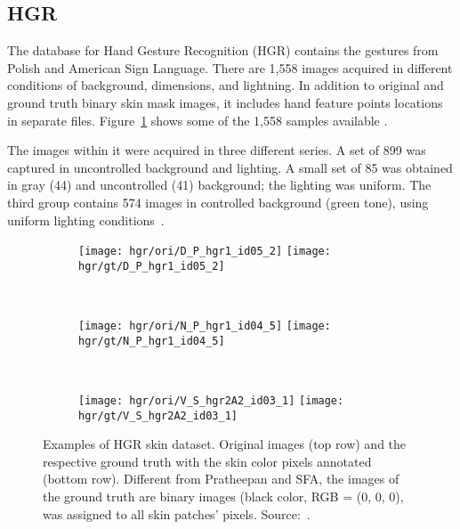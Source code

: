 \subsection{HGR}
\label{sec:datasets_hgr}
The database for Hand Gesture Recognition (HGR) contains the gestures from Polish and American Sign Language. There are 1,558 images acquired in different conditions of background, dimensions, and lightning. In addition to original and ground truth binary skin mask images, it includes hand feature points locations in separate files. Figure~\ref{fig:hgr_dataset_exemplo} shows some of the 1,558 samples available \citep{kawulok:14, nalepa:14, grzejszczak:16}.

The images within it were acquired in three different series. A set of 899 was captured in uncontrolled background and lighting. A small set of 85 was obtained in gray (44) and uncontrolled (41) background; the lighting was uniform. The third group contains 574 images in controlled background (green tone), using uniform lighting conditions~\citep{kawulok:14, nalepa:14, grzejszczak:16}.

\begin{figure}[!hbt]
    \centering
    \begin{subfigure}[t]{0.3\textwidth}
        \texttt{[image: hgr/ori/D\_P\_hgr1\_id05\_2]}
        \texttt{[image: hgr/gt/D\_P\_hgr1\_id05\_2]}
    \end{subfigure}
    ~
    \begin{subfigure}[t]{0.275\textwidth}
        \texttt{[image: hgr/ori/N\_P\_hgr1\_id04\_5]}
        \texttt{[image: hgr/gt/N\_P\_hgr1\_id04\_5]}
    \end{subfigure}
    ~
    \begin{subfigure}[t]{0.337\textwidth}
        \texttt{[image: hgr/ori/V\_S\_hgr2A2\_id03\_1]}
        \texttt{[image: hgr/gt/V\_S\_hgr2A2\_id03\_1]}
    \end{subfigure}
    \caption[Examples of HGR skin dataset]{Examples of HGR skin dataset. Original images (top row) and the respective ground truth with the skin color pixels annotated (bottom row). Different from Pratheepan and SFA, the images of the ground truth are binary images (black color, RGB = (0, 0, 0), was assigned to all skin patches' pixels. Source:~\citet{kawulok:14, nalepa:14, grzejszczak:16}.}
    \label{fig:hgr_dataset_exemplo}
\end{figure}



